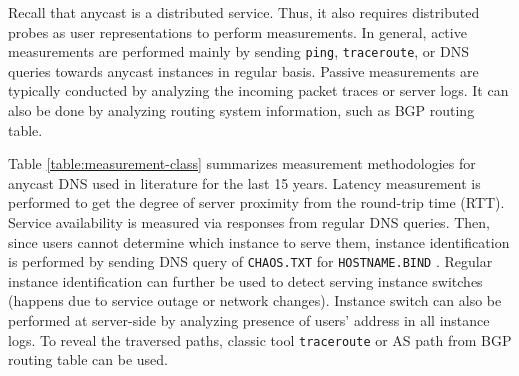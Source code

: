 Recall that anycast is a distributed service. Thus, it also requires distributed probes as user representations to perform measurements. In general, active measurements are performed mainly by sending \texttt{ping}, \texttt{traceroute}, or DNS queries towards anycast instances in regular basis. Passive measurements are typically conducted by analyzing the incoming packet traces or server logs. It can also be done by analyzing routing system information, such as BGP routing table. 

Table \ref{table:measurement-class} summarizes measurement methodologies for anycast DNS used in literature for the last 15 years. Latency measurement is performed to get the degree of server proximity from the round-trip time (RTT). Service availability is measured via responses from regular DNS queries. Then, since users cannot determine which instance to serve them, instance identification is performed by sending DNS query of \texttt{CHAOS.TXT} for \texttt{HOSTNAME.BIND} \cite{rfc4892}. Regular instance identification can further be used to detect serving instance switches (happens due to service outage or network changes). Instance switch can also be performed at server-side by analyzing presence of users' address in all instance logs. To reveal the traversed paths, classic tool \texttt{traceroute} or AS path from BGP routing table can be used.

